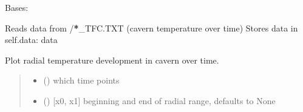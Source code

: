\documentclass[letterpaper,10pt,english]{sphinxmanual}
\begin{document}
\begin{fulllineitems}
\label{\detokenize{tscw_module:tscw_module.tscw_DataClassesOutput.TSCW_TFC}}
\pysigstartsignatures
{}
\pysigstopsignatures
\sphinxAtStartPar
Bases: {\hyperref[\detokenize{tscw_module:tscw_module.tscw_DataClassesOutput.TSCW_Output}]{}}

\sphinxAtStartPar
Reads data from /{\color{red}\bfseries{}*}\_TFC.TXT (cavern temperature over time)
Stores data in
self.data: \sphinxhyphen{} data

\begin{fulllineitems}
\label{\detokenize{tscw_module:tscw_module.tscw_DataClassesOutput.TSCW_TFC.plot_temp_distribution}}
\pysigstartsignatures
{}
\pysigstopsignatures
\sphinxAtStartPar
Plot radial temperature development in cavern over time.
\begin{quote}\begin{description}
\begin{itemize}
\item {} 
\sphinxAtStartPar
{} () \textendash{} which time points

\item {} 
\sphinxAtStartPar
{} (\sphinxstyleliteralemphasis{\sphinxupquote{, }}) \textendash{} {[}x0, x1{]} beginning and end of radial range, defaults to None

\end{itemize}

\end{description}\end{quote}

\end{fulllineitems}


\end{fulllineitems}
\end{document}

